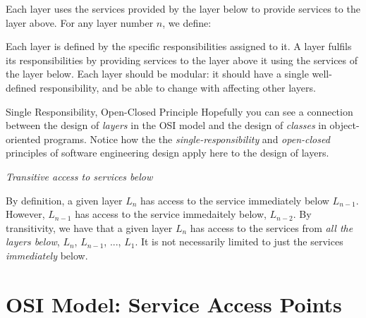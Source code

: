 Each layer uses the services provided by the layer below 
to provide services to the layer above.
For any layer number $n$, we define:


Each layer is defined by the specific responsibilities assigned to it. 
A layer fulfils its responsibilities by providing
services to the layer above it using the services of the layer below. 
Each layer should be modular: it should have a single well-defined 
responsibility, and be able to change with affecting other layers. 

\begin{sidenote}{Single Responsibility, Open-Closed Principle}
Hopefully you can see a connection between the design of \textit{layers} in the OSI model 
and the design of \textit{classes} in object-oriented programs. Notice how the
the \textit{single-responsibility} and \textit{open-closed} principles 
of software engineering design apply here to the design of layers. 
\end{sidenote}

\frmrule 

\textit{Transitive access to services below}

By definition, a given layer $L_n$ has access to the service immediately below $L_{n-1}$. 
However, $L_{n-1}$ has access to the service immedaitely below, $L_{n-2}$. 
By transitivity, we have that a given layer $L_n$ has access to 
the services from \textit{all the layers below}, $L_n$, $L_{n-1}$, ..., $L_1$. 
It is not necessarily limited to just the services \textit{immediately} below.



\frmrule 








\section{OSI Model: Service Access Points}



